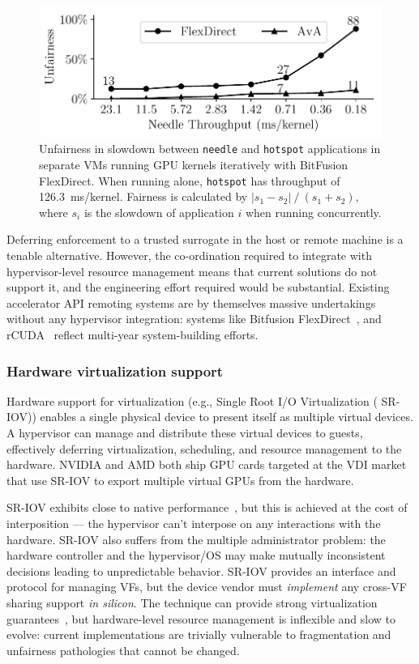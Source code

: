\begin{figure}[!t]
	\centering
	\includegraphics[width=.8\linewidth]{figures/bf_unfairness.pdf}
	\caption{Unfairness in slowdown between \lstinline|needle| and \lstinline|hotspot| applications in separate VMs running GPU kernels iteratively
    with BitFusion FlexDirect.
    When running alone, \lstinline|hotspot| has throughput of 126.3~ms/kernel.
    Fairness is calculated by $\left|s_1-s_2\right| \mathbin{/} (s_1+s_2),$
    where $s_i$ is the slowdown of application $i$ when running concurrently.
    }
	\label{fig:bitfusion_unfairness}
\end{figure}

Deferring enforcement to a trusted surrogate in the host or remote machine is
a tenable alternative. However, the co-ordination required to integrate with
hypervisor-level resource management means that current solutions do not
support it, and the engineering effort required would be substantial.
Existing accelerator API remoting systems are by themselves massive
undertakings without any hypervisor integration: systems like Bitfusion
FlexDirect~\cite{bitfusion}, and rCUDA~\cite{rCUDA} reflect multi-year
system-building efforts.

\subsubsection{Hardware virtualization support}
Hardware support for virtualization (e.g., Single Root I/O Virtualization (
SR-IOV)) enables a single physical device to present itself as multiple
virtual devices. A hypervisor can manage and distribute these virtual devices
to guests, effectively deferring virtualization, scheduling, and resource
management to the hardware. NVIDIA and AMD both ship GPU cards targeted at the
VDI market that use SR-IOV to export multiple virtual GPUs from the hardware.

SR-IOV exhibits close to native performance~\cite{XenSRIOV}, but this is
achieved at the cost of interposition --- the hypervisor can't interpose
on any interactions with the hardware. SR-IOV also suffers from the multiple
administrator problem: the hardware controller and the hypervisor/OS may make
mutually inconsistent decisions leading to unpredictable behavior.
SR-IOV provides an interface and protocol for managing VFs, but the device
vendor must \emph{implement} any cross-VF sharing support \emph{in silicon}.
The technique can provide strong virtualization guarantees~\cite{dong2012high,
dong2008sr}, but hardware-level resource management is inflexible and slow to
evolve: current implementations are trivially vulnerable to fragmentation and
unfairness pathologies that cannot be changed.

